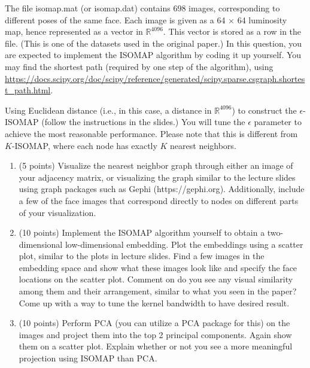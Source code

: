 \documentclass[twoside,10pt]{article}
\begin{document}
The file \textsf{isomap.mat} (or \textsf{isomap.dat}) contains 698 images, corresponding to different poses of the same face. Each image is given as a 64 $\times$ 64 luminosity map, hence represented as a vector in $\mathbb R^{4096}$. This vector is stored as a row in the file. (This is one of the datasets used in the original paper.) In this question, you are expected to implement the ISOMAP algorithm by coding it up yourself. You may find the shortest path (required by one step of the algorithm), using \url{https://docs.scipy.org/doc/scipy/reference/generated/scipy.sparse.csgraph.shortest_path.html}. 


Using Euclidean distance (i.e., in this case, a distance in $\mathbb R^{4096}$) to construct the $\epsilon$-ISOMAP (follow the instructions in the slides.) You will tune the $\epsilon$ parameter to achieve the most reasonable performance. Please note that this is different from $K$-ISOMAP, where each node has exactly $K$ nearest neighbors.

\begin{enumerate} 

\item (5 points) Visualize the nearest neighbor graph through either an image of your adjacency matrix, or visualizing the graph similar to the lecture slides using graph packages such as Gephi (\textsf{https://gephi.org}). Additionally, include a few of the face images that correspond directly to nodes on different parts of your visualization.
 
\item (10 points) Implement the ISOMAP algorithm yourself to obtain a two-dimensional low-dimensional embedding. Plot the embeddings using a scatter plot, similar to the plots in lecture slides. Find a few images in the embedding space and show what these images look like and specify the face locations on the scatter plot. Comment on do you see any visual similarity among them and their arrangement, similar to what you seen in the paper? Come up with a way to tune the kernel bandwidth to have desired result.

\item (10 points) Perform PCA (you can utilize a PCA package for this) on the images and project them into the top 2 principal components. Again show them on a scatter plot. Explain whether or not you see a more meaningful projection using ISOMAP than PCA. 

\end{enumerate}
\end{document}
